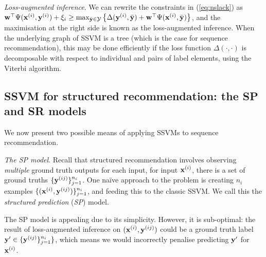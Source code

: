 \emph{Loss-augmented inference}.
We can rewrite the constraints in (\ref{eq:nslack}) as 
$\mathbf{w}^\top \Psi(\mathbf{x}^{({i})}, \mathbf{y}^{({i})}) + \xi_i \ge 
\max_{\bar{\mathbf{y}} \in \mathcal{Y}} \left\{ \Delta(\mathbf{y}^{({i})}, \bar{\mathbf{y}}) + \mathbf{w}^\top \Psi(\mathbf{x}^{({i})}, \bar{\mathbf{y}}) \right\}$,
and the maximisation at the right side is known as the loss-augmented inference.
When the underlying graph of SSVM is a tree (which is the case for sequence recommendation),
this may be done efficiently if the loss function $\Delta(\cdot,\cdot)$ is decomposable
with respect to individual and pairs of label elements,
\eg using the Viterbi algorithm.

\secmoveup
\subsection{SSVM for structured recommendation: the SP and SR models}
\label{ssec:sr}
\textmoveup

We now present two possible means of applying SSVMs to sequence recommendation.

\emph{The SP model}.
Recall that structured recommendation
involves observing \emph{multiple} ground truth outputs for each input, \ie
for input $\mathbf{x}^{({i})}$, there is a set of ground truths $\{\mathbf{y}^{({ij})}\}_{j=1}^{n_i}$.
One na\"{i}ve approach to the problem
is creating 
$n_i$ examples $\{(\mathbf{x}^{({i})}, \mathbf{y}^{({ij})})\}_{j=1}^{n_i}$,
and feeding this to the classic SSVM. %
We call this the \emph{structured prediction} (\emph{SP}) model.

The SP model is appealing due to its simplicity.
However, it is sub-optimal:
the result of loss-augmented inference on $(\mathbf{x}^{({i})}, \mathbf{y}^{({ij})})$ could be a ground truth label $\mathbf{y}' \in \{\mathbf{y}^{({ij})}\}_{j=1}^{n_i}\}$,
which means we would incorrectly penalise predicting $\mathbf{y}'$ for $\mathbf{x}^{({i})}$. 

